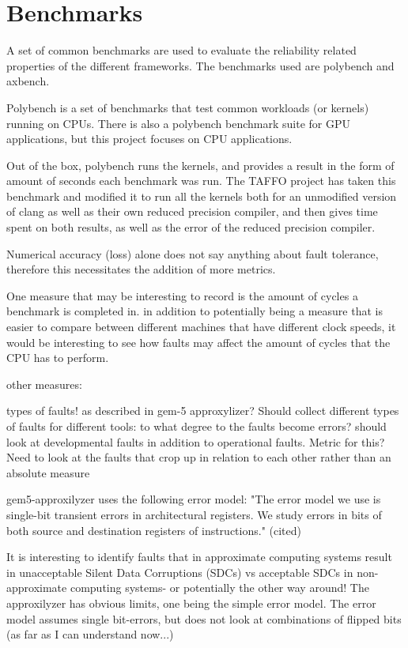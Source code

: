 \section{Benchmarks}

A set of common benchmarks are used to evaluate the reliability related properties of the different frameworks. The benchmarks used are polybench and axbench. 

Polybench is a set of benchmarks that test common workloads (or kernels) running on CPUs. There is also a polybench benchmark suite for GPU applications, but this project focuses on CPU applications. 

Out of the box, polybench runs the kernels, and provides a result in the form of amount of seconds each benchmark was run. The TAFFO project has taken this benchmark and modified it to run all the kernels both for an unmodified version of clang as well as their own reduced precision compiler, and then gives time spent on both results, as well as the error of the reduced precision compiler. 

Numerical accuracy (loss) alone does not say anything about fault tolerance, therefore this necessitates the addition of more metrics.

One measure that may be interesting to record is the amount of cycles a benchmark is completed in. in addition to potentially being a measure that is easier to compare between different machines that have different clock speeds, it would be interesting to see how faults may affect the amount of cycles that the CPU has to perform.

other measures:

types of faults! as described in gem-5 approxylizer?
Should collect different types of faults for different tools: to what degree to the faults become errors?
    should look at developmental faults in addition to operational faults. Metric for this? Need to look at the faults that crop up in relation to each other rather than an absolute measure

gem5-approxilyzer uses the following error model:
"The error model we use is single-bit transient errors in
architectural registers. We study errors in bits of both source
and destination registers of instructions." (cited) 

It is interesting to identify faults that in approximate computing systems result in unacceptable Silent Data Corruptions (SDCs) vs acceptable SDCs in non-approximate computing systems- or potentially the other way around!
The approxilyzer has obvious limits, one being the simple error model. The error model assumes single bit-errors, but does not look at combinations of flipped bits (as far as I can understand now...)

